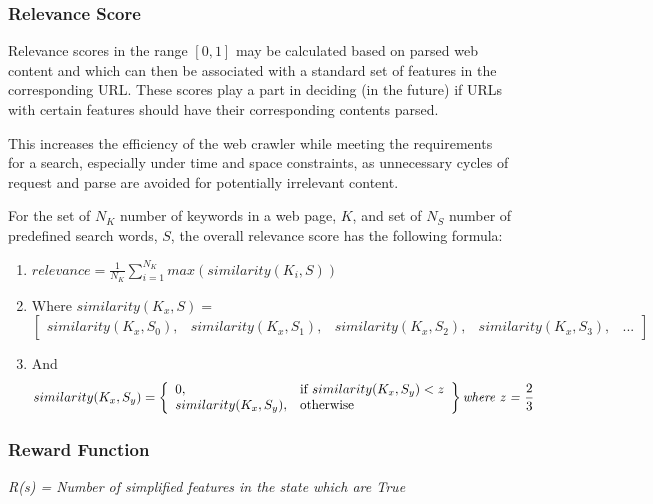 \documentclass{article}
\begin{document}
\subsubsection{Relevance Score}
\label{sec:5.2.2}
Relevance scores in the range $ [0, 1] $ may be calculated based on parsed web content and which can then be associated with a standard set of features in the corresponding URL. These scores play a part in deciding (in the future) if URLs with certain features should have their corresponding contents parsed.
\medskip

This increases the efficiency of the web crawler while meeting the requirements for a search, especially under time and space constraints, as unnecessary cycles of request and parse are avoided for potentially irrelevant content.
\medskip

\begin{comment}
However, caution must be exercised so that the learning hypothesis is not overly-dependent on the seed pages.
\medskip
\end{comment}

For the set of $ N_K $ number of keywords in a web page, $ K $, and set of $ N_S $ number of predefined search words, $ S $, the overall relevance score has the following formula:

\begin{enumerate}
	\item $ relevance = \frac{1}{N_K} \sum^{N_K}_{i = 1}max(similarity(K_i, S)) $

	\item Where %
$ similarity(K_x, S) = $
\[
	[\begin{array}{lllll}
	similarity(K_x, S_0), & similarity(K_x, S_1), & similarity(K_x, S_2), & similarity(K_x, S_3), & ...
	\end{array}]
\]

	\item And %
\[
	similarity(K_x, S_y) = \left\{\begin{array}{ll}
		0, & \text{if $ similarity(K_x, S_y) <  z $} \\
		similarity(K_x, S_y), & \text{otherwise}
	\end{array}\right\} \textit{where z = $ \frac{2}{3} $}
\]
\end{enumerate}

\subsubsection{Reward Function}
\textit{R(s) = Number of simplified features in the state which are True}
\end{document}
